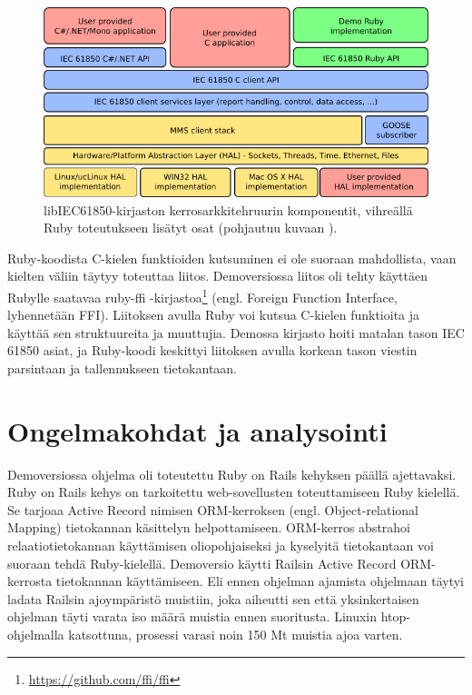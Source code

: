 \begin{figure}
	\includegraphics[width=1\textwidth]{pictures/libiec61850-layer-architecture.png}
	\caption{libIEC61850-kirjaston kerrosarkkitehruurin komponentit, vihreällä Ruby toteutukseen lisätyt osat (pohjautuu kuvaan \cite{libIEC61850-api-overview}).}
	\label{fig:libiec61850-layer-architecture}
\end{figure}

Ruby-koodista C-kielen funktioiden kutsuminen ei ole suoraan mahdollista, vaan kielten väliin täytyy toteuttaa liitos. Demoversiossa liitos oli tehty käyttäen Rubylle saatavaa ruby-ffi -kirjastoa\footnote{\url{https://github.com/ffi/ffi}} (engl. Foreign Function Interface, lyhennetään FFI). Liitoksen avulla Ruby voi kutsua C-kielen funktioita ja käyttää sen struktuureita ja muuttujia. Demossa kirjasto hoiti matalan tason IEC 61850 asiat, ja Ruby-koodi keskittyi liitoksen avulla korkean tason viestin parsintaan ja tallennukseen tietokantaan.


\section{Ongelmakohdat ja analysointi}
\label{ch:ongelmakohdat-ja-analysointi}
Demoversiossa ohjelma oli toteutettu Ruby on Rails kehyksen päällä ajettavaksi. Ruby on Rails kehys on tarkoitettu web-sovellusten toteuttamiseen Ruby kielellä. Se tarjoaa Active Record nimisen ORM-kerroksen (engl. Object-relational Mapping) tietokannan käsittelyn helpottamiseen. ORM-kerros abstrahoi relaatiotietokannan käyttämisen oliopohjaiseksi ja kyselyitä tietokantaan voi suoraan tehdä Ruby-kielellä. Demoversio käytti Railsin Active Record ORM-kerrosta tietokannan käyttämiseen. Eli ennen ohjelman ajamista ohjelmaan täytyi ladata Railsin ajoympäristö muistiin, joka aiheutti sen että yksinkertaisen ohjelman täyti varata iso määrä muistia ennen suoritusta. Linuxin htop-ohjelmalla katsottuna, prosessi varasi noin 150 Mt muistia ajoa varten.

